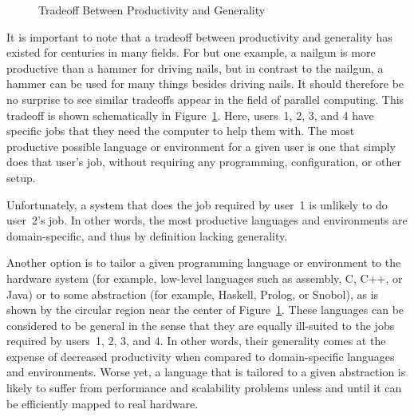 \begin{figure}[tb]
\centering
{}
\caption{Tradeoff Between Productivity and Generality}
\label{fig:intro:Tradeoff Between Productivity and Generality}
\end{figure}

It is important to note that a tradeoff between productivity and
generality has existed for centuries in many fields.
For but one example, a nailgun is more productive than a hammer for
driving nails, but in contrast to the nailgun, a hammer can be used for
many things besides driving nails.
It should therefore be no surprise to see similar tradeoffs
appear in the field of parallel computing.
This tradeoff is shown schematically in
Figure~\ref{fig:intro:Tradeoff Between Productivity and Generality}.
Here, users~1, 2, 3, and 4 have specific jobs that they need the computer
to help them with.
The most productive possible language or environment for a given user is one
that simply does that user's job, without requiring any programming,
configuration, or other setup.

\QuickQuizEnd

Unfortunately, a system that does the job required by user~1 is
unlikely to do user~2's job.
In other words, the most productive languages and environments are
domain-specific, and thus by definition lacking generality.

Another option is to tailor a given programming language or environment
to the hardware system (for example, low-level languages such as
assembly, C, C++, or Java) or to some abstraction (for example,
Haskell, Prolog, or Snobol), as is shown by the circular region near
the center of
Figure~\ref{fig:intro:Tradeoff Between Productivity and Generality}.
These languages can be considered to be general in the sense that they
are equally ill-suited to the jobs required by users~1, 2, 3, and 4.
In other words, their generality comes at the expense of
decreased productivity when compared to domain-specific languages
and environments.
Worse yet, a language that is tailored to a given abstraction
is likely to suffer from performance and scalability problems
unless and until it can be efficiently mapped to real hardware.

